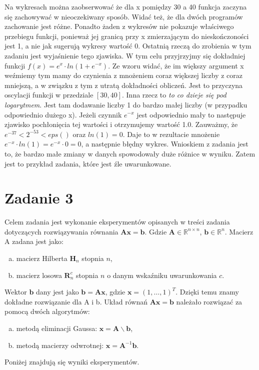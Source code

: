 \documentclass[]{article}
\begin{document}
	Na wykresach można zaobserwować że dla x pomiędzy 30 a 40 funkcja zaczyna się zachowywać w nieoczekiwany sposób. Widać też, że dla dwóch programów zachowanie jest różne. Ponadto żaden z wykresów nie pokazuje właściwego przebiegu funkcji, ponieważ jej granicą przy x zmierzającym do nieskończoności jest 1, a nie jak sugerują wykresy wartość 0. Ostatnią rzeczą do zrobienia w tym zadaniu jest wyjaśnienie tego zjawiska. W tym celu przyjrzyjmy się dokładniej funkcji  $f(x) = e^{x}\cdot ln(1+e^{-x})$. Ze wzoru widać, że im większy argument x weźmiemy tym mamy do czynienia z mnożeniem coraz większej liczby z coraz mniejszą, a w związku z tym z utratą dokładności obliczeń. Jest to przyczyna oscylacji funkcji w przedziale $[30,40]$. Inna rzecz to \textit{to co dzieje się pod logarytmem}.
	Jest tam dodawanie liczby 1 do bardzo małej liczby (w przypadku odpowiednio dużego x). Jeżeli czynnik $e^{-x}$ jest odpowiednio mały to następuje zjawisko pochłonięcia tej wartości i otrzymujemy wartość 1.0. Zauważmy, że $e^{-37} < 2^{-53} < eps()$ oraz $ln(1) = 0$. Daje to w rezultacie mnożenie $e^{-x}\cdot ln(1)=e^{-x}\cdot0 = 0$, a następnie błędny wykres. Wnioskiem z zadania jest to, że bardzo małe zmiany w danych spowodowały duże różnice w wyniku. Zatem jest to przykład zadania, które jest źle uwarunkowane.
	
	\clearpage

	\section*{Zadanie 3} 
	
	Celem zadania jest wykonanie eksperymentów opisanych w treści zadania dotyczących rozwiązywania równania $\mathbf{Ax = b}$. Gdzie $\mathbf{A} \in \mathbb{R}^{n\times n}$,  $\mathbf{b} \in \mathbb{R}^n$.
	Macierz A zadana jest jako:
	\begin{enumerate}[a)]
		\item macierz Hilberta $\mathbf{H}_n$ stopnia $n$,
		\item macierz losowa $\mathbf{R}_n^c$ stopnia $n$ o danym wskaźniku uwarunkowania $c$.
	\end{enumerate}
	Wektor $\mathbf{b}$ dany jest jako $\mathbf{b = Ax}$, gdzie $\mathbf{x} = (1, \dots, 1)^{T}$. Dzięki temu znamy dokładne rozwiązanie dla A i b. Układ równań $\mathbf{Ax} = \mathbf{b}$ należało rozwiązać za pomocą dwóch algorytmów:
	\begin{enumerate}[a)]
		\item metodą eliminacji Gaussa: $\mathbf{x} = \mathbf{A} \backslash \mathbf{b}$,
		\item metodą macierzy odwrotnej: $\mathbf{x} = \mathbf{A}^{-1}\mathbf{b}$.
	\end{enumerate}
	Poniżej znajdują się wyniki eksperymentów.
	
\end{document}
